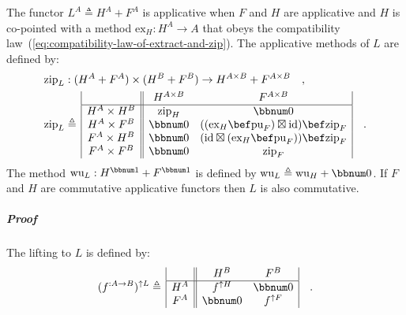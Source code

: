 The functor $L^{A}\triangleq H^{A}+F^{A}$ is applicative when $F$
and $H$ are applicative and $H$ is co-pointed with a method $\text{ex}_{H}:H^{A}\rightarrow A$
that obeys the compatibility law~(\ref{eq:compatibility-law-of-extract-and-zip}).
The applicative methods of $L$ are defined by:
\begin{align*}
 & \text{zip}_{L}:(H^{A}+F^{A})\times(H^{B}+F^{B})\rightarrow H^{A\times B}+F^{A\times B}\quad,\\
 & \text{zip}_{L}\triangleq\,\begin{array}{|c||cc|}
 & H^{A\times B} & F^{A\times B}\\
\hline H^{A}\times H^{B} & \text{zip}_{H} & \bbnum 0\\
H^{A}\times F^{B} & \bbnum 0 & ((\text{ex}_{H}\bef\text{pu}_{F})\boxtimes\text{id})\bef\text{zip}_{F}\\
F^{A}\times H^{B} & \bbnum 0 & (\text{id}\boxtimes(\text{ex}_{H}\bef\text{pu}_{F}))\bef\text{zip}_{F}\\
F^{A}\times F^{B} & \bbnum 0 & \text{zip}_{F}
\end{array}\quad.
\end{align*}
The method $\text{wu}_{L}:H^{\bbnum 1}+F^{\bbnum 1}$ is defined by
$\text{wu}_{L}\triangleq\text{wu}_{H}+\bbnum 0$. If $F$ and $H$
are commutative applicative functors then $L$ is also commutative.

\subparagraph{Proof}

The lifting to $L$ is defined by:
\[
(f^{:A\rightarrow B})^{\uparrow L}\triangleq\,\begin{array}{|c||cc|}
 & H^{B} & F^{B}\\
\hline H^{A} & f^{\uparrow H} & \bbnum 0\\
F^{A} & \bbnum 0 & f^{\uparrow F}
\end{array}\quad.
\]

